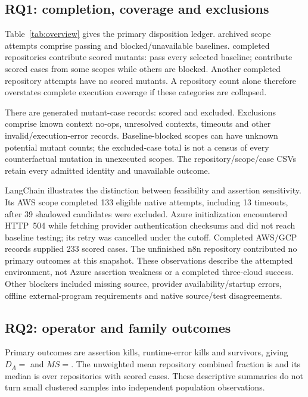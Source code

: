 \subsection{RQ1: completion, coverage and exclusions}\label{sec:completion}
Table~\ref{tab:overview} gives the primary disposition ledger. \CompletedScopes{} archived scope attempts comprise \PassingBaselines{} passing and \BlockedBaselines{} blocked/unavailable baselines. \ScoredRepos{} completed repositories contribute scored mutants: \FullCoverageRepos{} pass every selected baseline; \PartialCoverageRepos{} contribute scored cases from some scopes while others are blocked. Another \UnscoredRepos{} completed repository attempts have no scored mutants. A repository count alone therefore overstates complete execution coverage if these categories are collapsed.




There are \GeneratedCases{} generated mutant-case records: \NScored{} scored and \ExcludedCases{} excluded. Exclusions comprise \NoopCases{} known context no-ops, \UnresolvedCases{} unresolved contexts, \TimeoutCases{} timeouts and \OtherExcluded{} other invalid/execution-error records. Baseline-blocked scopes can have unknown potential mutant counts; the excluded-case total is not a census of every counterfactual mutation in unexecuted scopes. The repository/scope/case CSVs retain every admitted identity and unavailable outcome.

LangChain illustrates the distinction between feasibility and assertion sensitivity. Its AWS scope completed 133 eligible native attempts, including 13 timeouts, after 39 shadowed candidates were excluded. Azure initialization encountered HTTP~504 while fetching provider authentication checksums and did not reach baseline testing; its retry was cancelled under the cutoff. Completed AWS/GCP records supplied 233 scored cases. The unfinished n8n repository contributed no primary outcomes at this snapshot. These observations describe the attempted environment, not Azure assertion weakness or a completed three-cloud success. Other blockers included missing source, provider availability/startup errors, offline external-program requirements and native source/test disagreements.

\subsection{RQ2: operator and family outcomes}\label{sec:operatorresults}
Primary outcomes are \AssertionKills{} assertion kills, \RuntimeKills{} runtime-error kills and \Survivors{} survivors, giving $D_A=$\AssertionPct{} and $MS=$\CombinedPct{}. The unweighted mean repository combined fraction is \MacroPct{} and its median is \MedianRepoPct{} over repositories with scored cases. These descriptive summaries do not turn small clustered samples into independent population observations.

